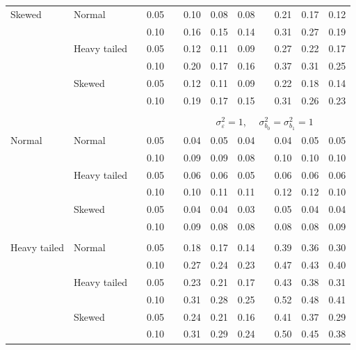 \documentclass[12pt]{article} %
\begin{document}
\begin{table}[ht]
\begin{scriptsize}
\begin{center}
\begin{tabular}{ll p{.1cm} c p{.1cm} rrr p{.1cm} rrr}
Skewed       & Normal       && 0.05 &&   0.10 & 0.08 & 0.08 && 0.21 & 0.17 & 0.12 \\ 
             &              && 0.10 &&   0.16 & 0.15 & 0.14 && 0.31 & 0.27 & 0.19 \\ 
             & Heavy tailed && 0.05 &&   0.12 & 0.11 & 0.09 && 0.27 & 0.22 & 0.17 \\ 
             &              && 0.10 &&   0.20 & 0.17 & 0.16 && 0.37 & 0.31 & 0.25 \\ 
             & Skewed       && 0.05 &&   0.12 & 0.11 & 0.09 && 0.22 & 0.18 & 0.14 \\ 
             &              && 0.10 &&   0.19 & 0.17 & 0.15 && 0.31 & 0.26 & 0.23 \\ 

&&&&&&&&&&&\\
& && && \multicolumn{7}{c}{$\sigma_{\varepsilon}^2 = 1$, \ \ $\sigma_{b_0}^2 = \sigma_{b_1}^2 = 1$} \\ \cline{6-12}
\rowcolor{gray!20}Normal       & Normal       && 0.05 &&   0.04 & 0.05 & 0.04 && 0.04 & 0.05 & 0.05 \\ 
\rowcolor{gray!20}             &              && 0.10 &&   0.09 & 0.09 & 0.08 && 0.10 & 0.10 & 0.10 \\ 
\rowcolor{gray!20}             & Heavy tailed && 0.05 &&   0.06 & 0.06 & 0.05 && 0.06 & 0.06 & 0.06 \\ 
\rowcolor{gray!20}             &              && 0.10 &&   0.10 & 0.11 & 0.11 && 0.12 & 0.12 & 0.10 \\ 
\rowcolor{gray!20}             & Skewed       && 0.05 &&   0.04 & 0.04 & 0.03 && 0.05 & 0.04 & 0.04 \\ 
\rowcolor{gray!20}             &              && 0.10 &&   0.09 & 0.08 & 0.08 && 0.08 & 0.08 & 0.09 \\ 
             &&&&&&&&&&&\\
Heavy tailed & Normal       && 0.05 &&   0.18 & 0.17 & 0.14 && 0.39 & 0.36 & 0.30 \\ 
             &              && 0.10 &&   0.27 & 0.24 & 0.23 && 0.47 & 0.43 & 0.40 \\ 
             & Heavy tailed && 0.05 &&   0.23 & 0.21 & 0.17 && 0.43 & 0.38 & 0.31 \\ 
             &              && 0.10 &&   0.31 & 0.28 & 0.25 && 0.52 & 0.48 & 0.41 \\ 
             & Skewed       && 0.05 &&   0.24 & 0.21 & 0.16 && 0.41 & 0.37 & 0.29 \\ 
             &              && 0.10 &&   0.31 & 0.29 & 0.24 && 0.50 & 0.45 & 0.38 \\ 

\end{tabular}
\end{center}
\end{scriptsize}
\end{table}
\end{document}
